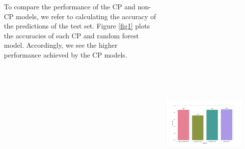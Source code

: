 \documentclass[a0paper,portrait,margin=0pt, colspace=24pt,subcolspace=0pt,blockverticalspace=36pt,innermargin=50pt]{tikzposter}
\begin{document}
\begin{columns}
{\begin{center}
	\end{center}
\vspace{1cm}
	To compare the performance of the CP and non-CP models, we refer to calculating the accuracy of the predictions of the test set. Figure \ref{fig1} plots the accuracies of each CP and random forest model. Accordingly, we see the higher performance achieved by the CP models.
 	\begin{center}
		\includegraphics[width=0.9\linewidth, height=13cm]{Figure_1.png}
  \label{fig1}
	\end{center}
	
	


 }
%
%


\end{columns}
\end{document}
